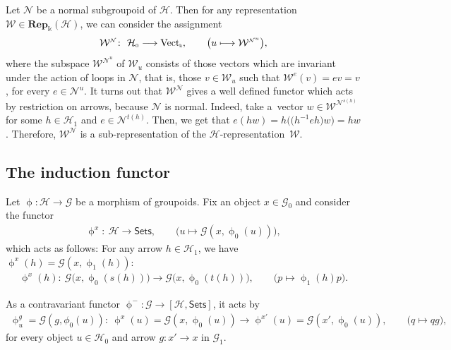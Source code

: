 \documentclass[pdftex]{sigma}
\numberwithin{equation}{section}
\newcommand{\Rep}[1]{\mathbf{Rep}_{\Sscript{\Bbbk}}(#1)}
\newcommand{\Vect}{{\rm Vect}_{\Sscript{\Bbbk}}}
\newcommand{\Go}{\cG_{\Sscript{0}}}
\newcommand{\Ga}{\cG_{\Sscript{1}}}
\newcommand{\Ho}{\cH_{\Sscript{0}}}
\newcommand{\Ha}{\cH_{\Sscript{1}}}
\newcommand{\Wu}{\cW_{\Sscript{u}}}
\newcommand{\We}{\cW^{\Sscript{e}}}
\newcommand{\cG}{{\mathcal G}}
\newcommand{\cH}{{\mathcal H}}
\newcommand{\cN}{{\mathcal N}}
\newcommand{\cW}{{\mathcal W}}
\newcommand{\phix}{\upphi^{\Sscript{x}}}
\newcommand{\phixp}{\upphi^{\Sscript{x'}}}
\newcommand{\Sets}{\mathsf{Sets}}
\newcommand{\Sscript}[1]{\scriptscriptstyle{#1}}
\begin{document}
\begin{Remark}\label{rem:WN} Let $\cN$ be a normal subgroupoid of $\cH$. Then for any representation $\cW \in \Rep{\cH}$, we can consider the assignment
\begin{gather*}
\cW^{\Sscript{\cN}}\colon \ \Ho \longrightarrow \Vect, \qquad \big( u \longmapsto \cW^{\Sscript{\cN^u}} \big),
\end{gather*}
where the subspace $\cW^{\Sscript{\cN^u}}$ of $\Wu$ consists of those vectors which are invariant under the action of loops in $\cN$, that is, those $v \in \Wu$ such that $\We(v)=e v=v$, for every $e \in \cN^{\Sscript{u}}$. It turns out that $\cW^{\Sscript{\cN}}$ gives a well defined functor which acts by restriction on arrows, because $\cN$ is normal. Indeed, take a~vector $w \in \cW^{\Sscript{\cN^{s(h)}}}$ for some $h \in \Ha$ and $e \in \cN^{\Sscript{t(h)}}$. Then, we get that $e (h w)= h \big(\big(h^{-1}eh\big)w \big)=h w$. Therefore, $\cW^{\Sscript{\cN}}$ is a sub-representation of the $\cH$-representation~$\cW$.
\end{Remark}

\subsection{The induction functor}\label{ssec:Ind}
Let $\upphi: \cH \to \cG$ be a morphism of groupoids. Fix an object $x \in \Go$ and consider the functor
\begin{gather*}
\phix\colon \ \cH \longrightarrow \Sets, \qquad \big( u \longmapsto \cG(x,\upphi_{\Sscript{0}}(u)) \big),
\end{gather*}
which acts as follows: For any arrow $h\in \Ha$, we have $\phix(h)=\cG(x, \upphi_{\Sscript{1}}(h))$:
\begin{gather}\label{Eq:Tartu}
\phix(h) \colon \ \cG\big(x, \upphi_{\Sscript{0}}(s(h)) \big) \longrightarrow \cG\big(x, \upphi_{\Sscript{0}}(t(h)) \big), \qquad \big( p \longmapsto \upphi_{\Sscript{1}}(h) p\big).
\end{gather}

As a contravariant functor $\upphi^{-}\colon \cG \to \left[\cH, \Sets\right]$, it acts by
\begin{gather}\label{Eq:Oslo}
\upphi^{\Sscript{g}}_u=\cG(g,\phi_{\Sscript{0}}(u))\colon \ \phix(u)=\cG(x,\upphi_{\Sscript{0}}(u) ) \longrightarrow \phixp(u)=\cG(x',\upphi_{\Sscript{0}}(u)), \qquad \big( q \longmapsto q g \big),
\end{gather}
for every object $u \in \Ho$ and arrow $g\colon x' \to x$ in $\Ga$.
\end{document}
